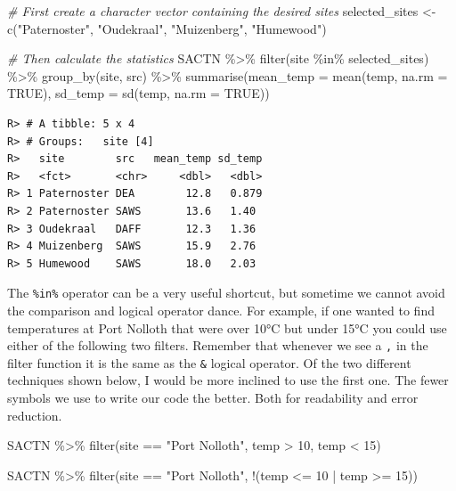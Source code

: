 \documentclass[
]{book}
\newenvironment{Shaded}{\begin{snugshade}}{\end{snugshade}}
\newcommand{\AttributeTok}[1]{\textcolor[rgb]{0.77,0.63,0.00}{#1}}
\newcommand{\CommentTok}[1]{\textcolor[rgb]{0.56,0.35,0.01}{\textit{#1}}}
\newcommand{\ConstantTok}[1]{\textcolor[rgb]{0.00,0.00,0.00}{#1}}
\newcommand{\DecValTok}[1]{\textcolor[rgb]{0.00,0.00,0.81}{#1}}
\newcommand{\FunctionTok}[1]{\textcolor[rgb]{0.00,0.00,0.00}{#1}}
\newcommand{\NormalTok}[1]{#1}
\newcommand{\OtherTok}[1]{\textcolor[rgb]{0.56,0.35,0.01}{#1}}
\newcommand{\SpecialCharTok}[1]{\textcolor[rgb]{0.00,0.00,0.00}{#1}}
\newcommand{\StringTok}[1]{\textcolor[rgb]{0.31,0.60,0.02}{#1}}
\begin{document}
\begin{Shaded}
\begin{Highlighting}[]
\CommentTok{\# First create a character vector containing the desired sites}
\NormalTok{selected\_sites }\OtherTok{\textless{}{-}} \FunctionTok{c}\NormalTok{(}\StringTok{"Paternoster"}\NormalTok{, }\StringTok{"Oudekraal"}\NormalTok{, }\StringTok{"Muizenberg"}\NormalTok{, }\StringTok{"Humewood"}\NormalTok{)}

\CommentTok{\# Then calculate the statistics}
\NormalTok{SACTN }\SpecialCharTok{\%\textgreater{}\%} 
  \FunctionTok{filter}\NormalTok{(site }\SpecialCharTok{\%in\%}\NormalTok{ selected\_sites) }\SpecialCharTok{\%\textgreater{}\%}
  \FunctionTok{group\_by}\NormalTok{(site, src) }\SpecialCharTok{\%\textgreater{}\%} 
  \FunctionTok{summarise}\NormalTok{(}\AttributeTok{mean\_temp =} \FunctionTok{mean}\NormalTok{(temp, }\AttributeTok{na.rm =} \ConstantTok{TRUE}\NormalTok{), }
            \AttributeTok{sd\_temp =} \FunctionTok{sd}\NormalTok{(temp, }\AttributeTok{na.rm =} \ConstantTok{TRUE}\NormalTok{))}
\end{Highlighting}
\end{Shaded}

\begin{verbatim}
R> # A tibble: 5 x 4
R> # Groups:   site [4]
R>   site        src   mean_temp sd_temp
R>   <fct>       <chr>     <dbl>   <dbl>
R> 1 Paternoster DEA        12.8   0.879
R> 2 Paternoster SAWS       13.6   1.40 
R> 3 Oudekraal   DAFF       12.3   1.36 
R> 4 Muizenberg  SAWS       15.9   2.76 
R> 5 Humewood    SAWS       18.0   2.03
\end{verbatim}

The \texttt{\%in\%} operator can be a very useful shortcut, but sometime we cannot avoid the comparison and logical operator dance. For example, if one wanted to find temperatures at Port Nolloth that were over 10°C but under 15°C you could use either of the following two filters. Remember that whenever we see a \texttt{,} in the filter function it is the same as the \texttt{\&} logical operator. Of the two different techniques shown below, I would be more inclined to use the first one. The fewer symbols we use to write our code the better. Both for readability and error reduction.

\begin{Shaded}
\begin{Highlighting}[]
\NormalTok{SACTN }\SpecialCharTok{\%\textgreater{}\%} 
  \FunctionTok{filter}\NormalTok{(site }\SpecialCharTok{==} \StringTok{"Port Nolloth"}\NormalTok{, temp }\SpecialCharTok{\textgreater{}} \DecValTok{10}\NormalTok{, temp }\SpecialCharTok{\textless{}} \DecValTok{15}\NormalTok{)}

\NormalTok{SACTN }\SpecialCharTok{\%\textgreater{}\%} 
  \FunctionTok{filter}\NormalTok{(site }\SpecialCharTok{==} \StringTok{"Port Nolloth"}\NormalTok{, }\SpecialCharTok{!}\NormalTok{(temp }\SpecialCharTok{\textless{}=} \DecValTok{10} \SpecialCharTok{|}\NormalTok{ temp  }\SpecialCharTok{\textgreater{}=} \DecValTok{15}\NormalTok{))}
\end{Highlighting}
\end{Shaded}
\end{document}
